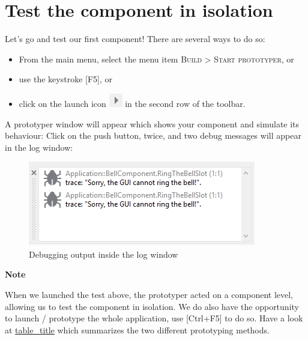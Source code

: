 \documentclass[
  a4paper,
,tablecaptionabove
]{scrbook}
\renewenvironment{quote}{\begin{customblockquote}\list{}{\rightmargin=0em\leftmargin=0em}%
\item\relax\color{blockquote-text}\ignorespaces}{\unskip\unskip\endlist\end{customblockquote}}
\begin{document}
\hypertarget{_test_the_component_in_isolation}{%
\section{Test the component in
isolation}\label{_test_the_component_in_isolation}}

Let's go and test our first component! There are several ways to do so:

\begin{itemize}
\item
  From the main menu, select the menu item \textsc{Build > Start prototyper}, or
\item
  use the keystroke {[}F5{]}, or
\item
  click on the launch icon
  \includegraphics{./../asciidoc/modules/ROOT/assets/images/icons/LaunchIcon.png}
  in the second row of the toolbar.
\end{itemize}

A prototyper window will appear which shows your component and simulate
its behaviour: Click on the push button, twice, and two debug messages
will appear in the log window:

\begin{figure}
\centering
\includegraphics{./../asciidoc/modules/ROOT/assets/images/firstcomponent/DebugOutput.png}
\caption{Debugging output inside the log window}
\end{figure}

\begin{quote}
\textbf{Note}

When we launched the test above, the prototyper acted on a component
level, allowing us to test the component in isolation. We do also have
the opportunity to launch / prototype the whole application, use
{[}Ctrl+F5{]} to do so. Have a look at
\protect\hyperlink{tab:ProtoyperStart}{table\_title} which summarizes
the two different prototyping methods.
\end{quote}
\end{document}

